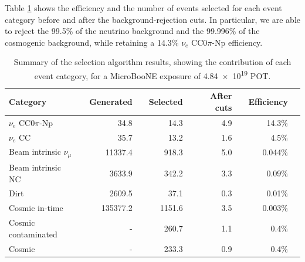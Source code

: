 Table \ref{tab:effafter} shows the efficiency and the number of events selected for each event category before and after the background-rejection cuts. In particular, we are able to reject the 99.5\% of the neutrino background and the 
99.996\% of the cosmogenic background, while retaining a 14.3\% $\nu_{e}$ CC0$\pi$-Np efficiency.

\begin{table}[htbp]
   \centering
   \begin{tabular}{llrrrrrrrr}
     \toprule
     Category & \phantom{a} & Generated & \phantom{a} & Selected & \phantom{a} & After cuts & \phantom{a} & Efficiency\\
     \midrule

     $\nu_{e}$ CC0$\pi$-Np       & & 34.8     & & 14.3   & & 4.9   & & 14.3\%\\
     $\nu_{e}$ CC                & & 35.7     & & 13.2   & & 1.6   & & 4.5\%\\
     Beam intrinsic $\nu_{\mu}$  & & 11337.4  & & 918.3  & & 5.0   & & 0.044\%\\
     Beam intrinsic NC           & & 3633.9   & & 342.2  & & 3.3   & & 0.09\%\\
     Dirt                        & & 2609.5   & & 37.1   & & 0.3   & & 0.01\%\\
     Cosmic in-time              & & 135377.2 & & 1151.6 & & 3.5   & & 0.003\%\\
     Cosmic contaminated         & & -        & & 260.7  & & 1.1   & & 0.4\%\\
     Cosmic                      & & -        & & 233.3  & & 0.9   & & 0.4\%\\

     \bottomrule
   \end{tabular}
   \caption{Summary of the selection algorithm results, showing the contribution of each event category, for a MicroBooNE exposure of \num{4.84e19} POT.}\label{tab:effafter}
\end{table}

